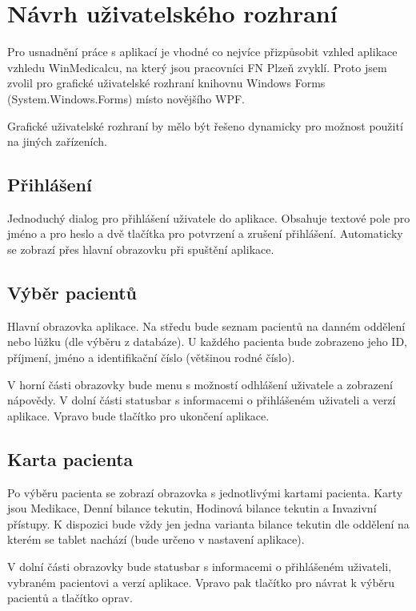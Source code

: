 \setlength{\parskip}{1em}

\chapter{Návrh uživatelského rozhraní}

Pro usnadnění práce s aplikací je vhodné co nejvíce přizpůsobit vzhled aplikace vzhledu WinMedicalcu, na který jsou pracovníci FN Plzeň zvyklí. Proto jsem zvolil pro grafické uživatelské rozhraní knihovnu Windows Forms (System.Windows.Forms) místo novějšího WPF.

Grafické uživatelské rozhraní by mělo být řešeno dynamicky pro možnost použití na jiných zařízeních.

\section{Přihlášení}

Jednoduchý dialog pro přihlášení uživatele do aplikace. Obsahuje textové pole pro jméno a pro heslo a dvě tlačítka pro potvrzení a zrušení přihlášení. Automaticky se zobrazí přes hlavní obrazovku při spuštění aplikace.

\section{Výběr pacientů}

Hlavní obrazovka aplikace. Na středu bude seznam pacientů na danném oddělení nebo lůžku (dle výběru z databáze). U každého pacienta bude zobrazeno jeho ID, příjmení, jméno a identifikační číslo (většinou rodné číslo).

V horní části obrazovky bude menu s možností odhlášení uživatele a zobrazení nápovědy. V dolní části statusbar s informacemi o přihlášeném uživateli a verzí aplikace. Vpravo bude tlačítko pro ukončení aplikace.

\section{Karta pacienta}

Po výběru pacienta se zobrazí obrazovka s jednotlivými kartami pacienta. Karty jsou Medikace, Denní bilance tekutin, Hodinová bilance tekutin a Invazivní přístupy. K dispozici bude vždy jen jedna varianta bilance tekutin dle oddělení na kterém se tablet nachází (bude určeno v nastavení aplikace).

V dolní části obrazovky bude statusbar s informacemi o přihlášeném uživateli, vybraném pacientovi a verzí aplikace. Vpravo pak tlačítko pro návrat k výběru pacientů a tlačítko oprav.


